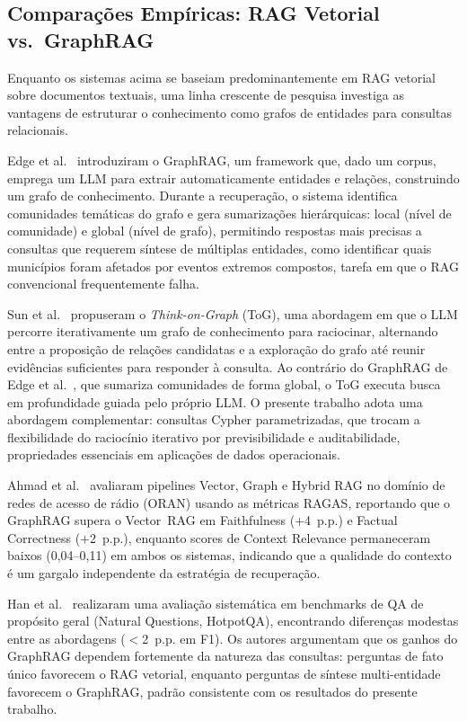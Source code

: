 \documentclass[conference]{IEEEtran}
\begin{document}
\subsection{Comparações Empíricas: RAG Vetorial vs.\ GraphRAG}

Enquanto os sistemas acima se baseiam predominantemente em RAG
vetorial sobre documentos textuais, uma linha crescente de pesquisa
investiga as vantagens de estruturar o conhecimento como grafos de
entidades para consultas relacionais.

Edge et al.~\cite{edge2024graphrag} introduziram o GraphRAG,
um framework que, dado um corpus, emprega um LLM para extrair
automaticamente entidades e relações, construindo um grafo de
conhecimento.
Durante a recuperação, o sistema identifica comunidades temáticas
do grafo e gera sumarizações hierárquicas: local (nível de
comunidade) e global (nível de grafo), permitindo respostas
mais precisas a consultas que requerem síntese de múltiplas
entidades, como identificar quais municípios foram afetados por
eventos extremos compostos, tarefa em que o RAG convencional
frequentemente falha.

Sun et al.~\cite{sun2024thinkongraph} propuseram o
\textit{Think-on-Graph} (ToG), uma abordagem em que o LLM
percorre iterativamente um grafo de conhecimento para raciocinar,
alternando entre a proposição de relações candidatas e a exploração
do grafo até reunir evidências suficientes para responder à consulta.
Ao contrário do GraphRAG de Edge et al.~\cite{edge2024graphrag},
que sumariza comunidades de forma global, o ToG executa busca
em profundidade guiada pelo próprio LLM.
O presente trabalho adota uma abordagem complementar: consultas
Cypher parametrizadas, que trocam a flexibilidade do raciocínio
iterativo por previsibilidade e auditabilidade, propriedades
essenciais em aplicações de dados operacionais.

Ahmad et al.~\cite{ahmad2025benchmarking} avaliaram pipelines
Vector, Graph e Hybrid RAG no domínio de redes de acesso de rádio
(ORAN) usando as métricas RAGAS, reportando que o GraphRAG supera
o Vector~RAG em Faithfulness ($+$4~p.p.) e Factual Correctness
($+$2~p.p.), enquanto scores de Context Relevance permaneceram
baixos (0,04--0,11) em ambos os sistemas, indicando que a qualidade
do contexto é um gargalo independente da estratégia de recuperação.

Han et al.~\cite{han2025ragvsgraphrag} realizaram uma avaliação
sistemática em benchmarks de QA de propósito geral
(Natural Questions, HotpotQA), encontrando diferenças modestas
entre as abordagens ($<$2~p.p. em F1).
Os autores argumentam que os ganhos do GraphRAG dependem fortemente
da natureza das consultas: perguntas de fato único favorecem o RAG
vetorial, enquanto perguntas de síntese multi-entidade favorecem
o GraphRAG, padrão consistente com os resultados do presente trabalho.
\end{document}

